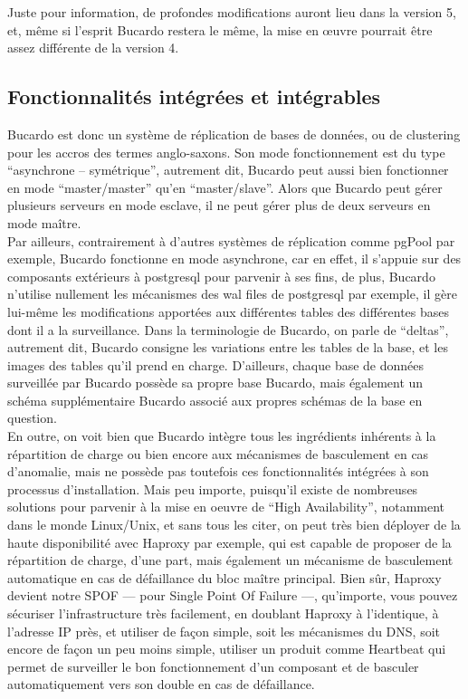 \documentclass[12pt]{report}
\begin{document}
Juste pour information, de profondes modifications auront lieu dans la version
5, et, même si l'esprit Bucardo restera le même, la mise en œuvre pourrait être
assez différente de la version 4. \\



\subsection{Fonctionnalités intégrées et intégrables}

Bucardo est donc un système de réplication de bases de données, ou de clustering
pour les accros des termes anglo-saxons. Son mode fonctionnement est du type
“asynchrone – symétrique”, autrement dit, Bucardo peut aussi bien fonctionner en
mode “master/master” qu'en “master/slave”. Alors que Bucardo peut gérer
plusieurs serveurs en mode esclave, il ne peut gérer plus de deux serveurs en
mode maître. \\

Par ailleurs, contrairement à d'autres systèmes de réplication comme pgPool par
exemple, Bucardo fonctionne en mode asynchrone, car en effet, il s'appuie sur
des composants extérieurs à postgresql pour parvenir à ses fins, de plus,
Bucardo n'utilise nullement les mécanismes des wal files de postgresql par
exemple, il gère lui-même les modifications apportées aux différentes tables des
différentes bases dont il a la surveillance. Dans la terminologie de Bucardo, on
parle de “deltas”, autrement dit, Bucardo consigne les variations entre les
tables de la base, et les images des tables qu'il prend en charge. D'ailleurs,
chaque base de données surveillée par Bucardo possède sa propre base Bucardo,
mais également un schéma supplémentaire Bucardo associé aux propres schémas de
la base en question. \\


En outre, on voit bien que Bucardo intègre tous les ingrédients inhérents à la
répartition de charge ou bien encore aux mécanismes de basculement en cas
d'anomalie, mais ne possède pas toutefois ces fonctionnalités intégrées à son
processus d'installation. Mais peu importe, puisqu'il existe de nombreuses
solutions pour parvenir à la mise en oeuvre de “High Availability”, notamment
dans le monde Linux/Unix, et sans tous les citer, on peut très bien déployer de
la haute disponibilité avec Haproxy par exemple, qui est capable de proposer de
la répartition de charge, d'une part, mais également un mécanisme de basculement
automatique en cas de défaillance du bloc maître principal. Bien sûr, Haproxy
devient notre SPOF — pour Single Point Of Failure —, qu'importe, vous pouvez
sécuriser l'infrastructure très facilement, en doublant Haproxy à l'identique, à
l'adresse IP près, et utiliser de façon simple, soit les mécanismes du DNS, soit
encore de façon un peu moins simple, utiliser un produit comme Heartbeat qui
permet de surveiller le bon fonctionnement d'un composant et de basculer
automatiquement vers son double en cas de défaillance. \\
\end{document}
